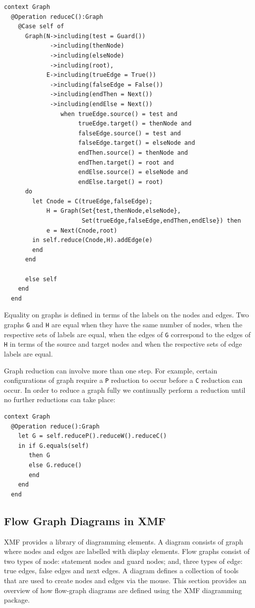 \documentclass{article}
\begin{document}
\begin{verbatim}
context Graph
  @Operation reduceC():Graph
    @Case self of
      Graph(N->including(test = Guard())
             ->including(thenNode)
             ->including(elseNode)
             ->including(root),
            E->including(trueEdge = True())
             ->including(falseEdge = False())
             ->including(endThen = Next())
             ->including(endElse = Next())
                when trueEdge.source() = test and
                     trueEdge.target() = thenNode and
                     falseEdge.source() = test and
                     falseEdge.target() = elseNode and
                     endThen.source() = thenNode and
                     endThen.target() = root and
                     endElse.source() = elseNode and
                     endElse.target() = root)
      do
        let Cnode = C(trueEdge,falseEdge);
            H = Graph(Set{test,thenNode,elseNode},
                      Set(trueEdge,falseEdge,endThen,endElse}) then
            e = Next(Cnode,root)
        in self.reduce(Cnode,H).addEdge(e)
        end
      end
      
      else self
    end
  end
\end{verbatim}
Equality on graphs is defined in terms of the labels on the nodes and edges.
Two graphs {\tt G} and {\tt H} are equal when they have the same number of
nodes, when the respective sets of labels are equal, when the edges of {\tt G} 
correspond to the edges of {\tt H} in terms of the source and target nodes and 
when the respective sets of edge labels are equal. 

Graph reduction can involve more than one step. For example, certain configurations
of graph require a {\tt P} reduction to occur before a {\tt C} reduction can
occur. In order to reduce a graph fully we continually perform a reduction until
no further reductions can take place:
\begin{verbatim}
context Graph
  @Operation reduce():Graph
    let G = self.reduceP().reduceW().reduceC()
    in if G.equals(self)
       then G
       else G.reduce()
       end
    end
  end
\end{verbatim}
                
\subsection{Flow Graph Diagrams in XMF}

XMF provides a library of diagramming elements. A diagram consists of graph where nodes and edges
are labelled with display elements. Flow graphs consist of two types of node: statement nodes and
guard nodes; and, three types of edge: true edges, false edges and next edges. A diagram defines
a collection of tools that are used to create nodes and edges via the mouse. This section provides
an overview of how flow-graph diagrams are defined using the XMF diagramming package.
\end{document}
